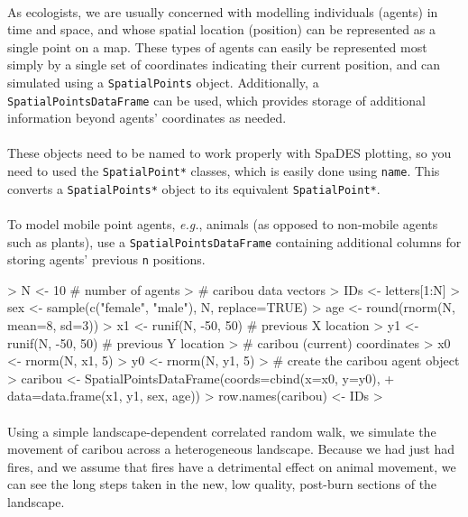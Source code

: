 \documentclass{article}
\begin{document}
\paragraph{}
As ecologists, we are usually concerned with modelling individuals (agents) in time and space, and whose spatial location (position) can be represented as a single point on a map. These types of agents can easily be represented most simply by a single set of coordinates indicating their current position, and can simulated using a \texttt{SpatialPoints} object. Additionally, a \texttt{SpatialPointsDataFrame} can be used, which provides storage of additional information beyond agents' coordinates as needed.

\paragraph{}
These objects need to be named to work properly with SpaDES plotting, so you need to used the \texttt{SpatialPoint*} classes, which is easily done using \texttt{name}. This converts a \texttt{SpatialPoints*} object to its equivalent \texttt{SpatialPoint*}.

\paragraph{}
To model mobile point agents, \textit{e.g.}, animals (as opposed to non-mobile agents such as plants), use a \texttt{SpatialPointsDataFrame} containing additional columns for storing agents' previous \texttt{n} positions.

\begin{Schunk}
\begin{Sinput}
> N <- 10 # number of agents
> # caribou data vectors
> IDs <- letters[1:N]
> sex <- sample(c("female", "male"), N, replace=TRUE)
> age <- round(rnorm(N, mean=8, sd=3))
> x1 <- runif(N, -50, 50) # previous X location
> y1 <- runif(N, -50, 50) # previous Y location
> # caribou (current) coordinates
> x0 <- rnorm(N, x1, 5)
> y0 <- rnorm(N, y1, 5)
> # create the caribou agent object
> caribou <- SpatialPointsDataFrame(coords=cbind(x=x0, y=y0),
+                                   data=data.frame(x1, y1, sex, age))
> row.names(caribou) <- IDs
> 
\end{Sinput}
\end{Schunk}

\paragraph{}
Using a simple landscape-dependent correlated random walk, we simulate the movement of caribou across a heterogeneous landscape. Because we had just had fires, and we assume that fires have a detrimental effect on animal movement, we can see the long steps taken in the new, low quality, post-burn sections of the landscape.
\end{document}
